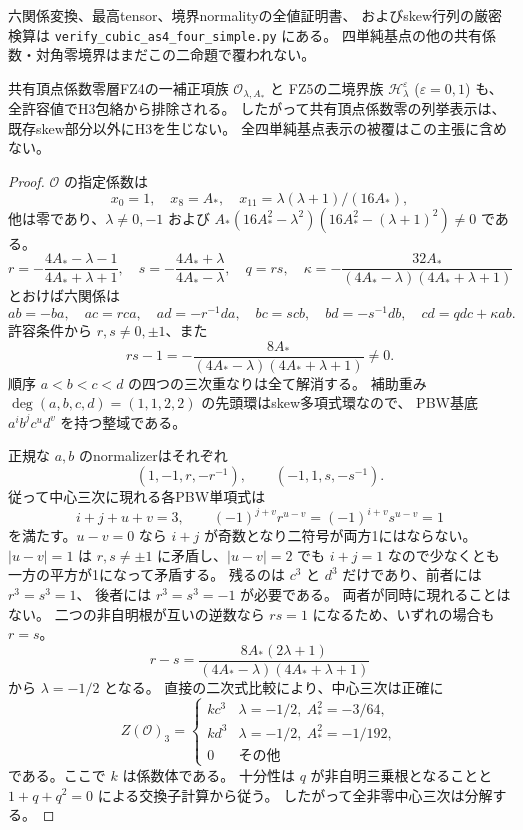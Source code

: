 六関係変換、最高tensor、境界normalityの全値証明書、
およびskew行列の厳密検算は
\texttt{verify\_cubic\_as4\_four\_simple.py} にある。
四単純基点の他の共有係数・対角零境界はまだこの二命題で覆われない。

\begin{proposition}\label{prop:cubic-fs-remaining}
共有頂点係数零層FZ4の一補正項族 $\mathcal O_{\lambda,A_*}$ と
FZ5の二境界族 $\mathcal H^\varepsilon_\lambda$ ($\varepsilon=0,1$) も、
全許容値でH3包絡から排除される。
したがって共有頂点係数零の列挙表示は、既存skew部分以外にH3を生じない。
全四単純基点表示の被覆はこの主張に含めない。
\end{proposition}
\begin{proof}
$\mathcal O$ の指定係数は
\[
 x_0=1,\quad x_8=A_*,\quad x_{11}=\lambda(\lambda+1)/(16A_*),
\]
他は零であり、$\lambda\ne0,-1$ および
$A_*(16A_*^2-\lambda^2)(16A_*^2-(\lambda+1)^2)\ne0$ である。
\[
 r=-\frac{4A_*-\lambda-1}{4A_*+\lambda+1},\quad
 s=-\frac{4A_*+\lambda}{4A_*-\lambda},\quad
 q=rs,\quad \kappa=-\frac{32A_*}{(4A_*-\lambda)(4A_*+\lambda+1)}
\]
とおけば六関係は
\[
 ab=-ba,\quad ac=r ca,\quad ad=-r^{-1}da,\quad
 bc=s cb,\quad bd=-s^{-1}db,\quad cd=qdc+\kappa ab.
\]
許容条件から $r,s\ne0,\pm1$、また
\[
 rs-1=-\frac{8A_*}{(4A_*-\lambda)(4A_*+\lambda+1)}\ne0.
\]
順序 $a<b<c<d$ の四つの三次重なりは全て解消する。
補助重み $\deg(a,b,c,d)=(1,1,2,2)$ の先頭環はskew多項式環なので、
PBW基底 $a^ib^jc^ud^v$ を持つ整域である。

正規な $a,b$ のnormalizerはそれぞれ
\[
 (1,-1,r,-r^{-1}),\qquad(-1,1,s,-s^{-1}).
\]
従って中心三次に現れる各PBW単項式は
\[
 i+j+u+v=3,\qquad
 (-1)^{j+v}r^{u-v}=(-1)^{i+v}s^{u-v}=1
\]
を満たす。$u-v=0$ なら $i+j$ が奇数となり二符号が両方1にはならない。
$|u-v|=1$ は $r,s\ne\pm1$ に矛盾し、$|u-v|=2$ でも
$i+j=1$ なので少なくとも一方の平方が1になって矛盾する。
残るのは $c^3$ と $d^3$ だけであり、前者には $r^3=s^3=1$、
後者には $r^3=s^3=-1$ が必要である。
両者が同時に現れることはない。
二つの非自明根が互いの逆数なら $rs=1$ になるため、いずれの場合も $r=s$。
\[
 r-s=\frac{8A_*(2\lambda+1)}{(4A_*-\lambda)(4A_*+\lambda+1)}
\]
から $\lambda=-1/2$ となる。
直接の二次式比較により、中心三次は正確に
\[
 Z(\mathcal O)_3=
 \begin{cases}
 kc^3&\lambda=-1/2,\ A_*^2=-3/64,\\
 kd^3&\lambda=-1/2,\ A_*^2=-1/192,\\
 0&\text{その他}
 \end{cases}
\]
である。ここで $k$ は係数体である。
十分性は $q$ が非自明三乗根となることと
$1+q+q^2=0$ による交換子計算から従う。
したがって全非零中心三次は分解する。


\end{proof}

